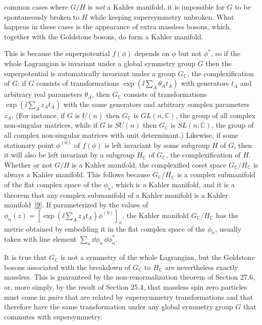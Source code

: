 common cases where \(G/H\) is \textit{not} a Kahler manifold, it is impossible
for \(G\) to be spontaneously broken to \(H\) while keeping supersymmetry
unbroken. What happens in these cases is the appearance of extra massless
bosons, which, together with the Goldstone bosons, do form a Kahler manifold.

This is because the superpotential \(f(\phi)\) depends on \(\phi\) but not
\(\phi^*\), so if the whole Lagrangian is invariant under a global symmetry
group \(G\) then the superpotential is automatically invariant under a group
\(G_{\mathbb{C}}\), the complexification of \(G\): if \(G\) consists of
transformations \(\exp(\ii\sum_A\theta_A t_A)\) with generators \(t_A\) and
arbitrary real parameters \(\theta_A\), then \(G_{\mathbb{C}}\) consists of
transformations \(\exp(\ii\sum_A z_A t_A)\) with the same generators and
arbitrary complex parameters \(z_A\). (For instance, if \(G\) is \(U(n)\)
then \(G_{\mathbb{C}}\) is \(GL(n,\mathbb{C})\), the group of all complex
non-singular matrices, while if \(G\) is \(SU(n)\) then \(G_{\mathbb{C}}\) is
\(SL(n,\mathbb{C})\), the group of all complex non-singular matrices with
unit determinant.) Likewise, if some stationary point \(\phi^{(0)}\) of
\(f(\phi)\) is left invariant by some subgroup \(H\) of \(G\), then it will
also be left invariant by a subgroup \(H_{\mathbb{C}}\) of
\(G_{\mathbb{C}}\), the complexification of \(H\). Whether or not \(G/H\) is
a Kahler manifold, the complexified coset space
\(G_{\mathbb{C}}/H_{\mathbb{C}}\) is always a Kahler manifold. This follows
because \(G_{\mathbb{C}}/H_{\mathbb{C}}\) is a complex submanifold of the flat
complex space of the \(\phi_n\), which is a Kahler manifold, and it is a
theorem that any complex submanifold of a Kahler manifold is a Kahler
manifold~\hyperref[ch26-ref-9]{[9]}. If parameterized by the values of
\(\phi_n(z)=[\exp(\ii\sum_A z_A t_A)\phi^{(0)}]_n\), the Kahler manifold
\(G_{\mathbb{C}}/H_{\mathbb{C}}\) has the metric obtained by embedding it in
the flat complex space of the \(\phi_n\), usually taken with line element
\(\sum_n \dd\phi_n\,\dd\phi_n^*\).

It is true that \(G_{\mathbb{C}}\) is not a symmetry of the whole Lagrangian,
but the Goldstone bosons associated with the breakdown of \(G_{\mathbb{C}}\)
to \(H_{\mathbb{C}}\) are nevertheless exactly massless. This is guaranteed
by the non-renormalization theorem of Section 27.6, or, more simply, by the
result of Section 25.4, that massless spin zero particles must come in
\textit{pairs} that are related by supersymmetry transformations and that
therefore have the same transformation under any global symmetry group \(G\)
that commutes with supersymmetry.
